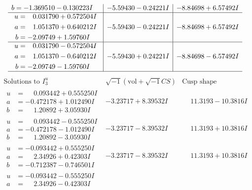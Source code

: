 \documentclass[1p]{elsarticle_modified}
\theoremstyle{definition}
\newcommand{\I}{\sqrt{-1}}
\begin{document}
$$\begin{array}{c|c|c}
\begin{aligned}
b &= -1.369510 - 0.130223 I\end{aligned}
 & -5.59430 - 0.24221 I & -8.84698 + 6.57492 I \\ \hline\begin{aligned}
u &= \phantom{-}0.031790 + 0.572504 I \\
a &= \phantom{-}1.051370 + 0.640212 I \\
b &= -2.09749 + 1.59760 I\end{aligned}
 & -5.59430 - 0.24221 I & -8.84698 + 6.57492 I \\ \hline\begin{aligned}
u &= \phantom{-}0.031790 - 0.572504 I \\
a &= \phantom{-}1.051370 - 0.640212 I \\
b &= -2.09749 - 1.59760 I\end{aligned}
 & -5.59430 + 0.24221 I & -8.84698 - 6.57492 I\\
 \hline 
 \end{array}$$\newpage$$\begin{array}{c|c|c}  
\text{Solutions to }I^u_{3}& \I (\text{vol} + \sqrt{-1}CS) & \text{Cusp shape}\\
 \hline 
\begin{aligned}
u &= \phantom{-}0.093442 + 0.555250 I \\
a &= -0.472178 + 1.012490 I \\
b &= \phantom{-}1.20892 + 3.05930 I\end{aligned}
 & -3.23717 + 8.39532 I & \phantom{-}11.3193 - 10.3816 I \\ \hline\begin{aligned}
u &= \phantom{-}0.093442 - 0.555250 I \\
a &= -0.472178 - 1.012490 I \\
b &= \phantom{-}1.20892 - 3.05930 I\end{aligned}
 & -3.23717 - 8.39532 I & \phantom{-}11.3193 + 10.3816 I \\ \hline\begin{aligned}
u &= -0.093442 + 0.555250 I \\
a &= \phantom{-}2.34926 + 0.42303 I \\
b &= -0.712387 - 0.746501 I\end{aligned}
 & -3.23717 - 8.39532 I & \phantom{-}11.3193 + 10.3816 I \\ \hline\begin{aligned}
u &= -0.093442 - 0.555250 I \\
a &= \phantom{-}2.34926 - 0.42303 I \\

\end{aligned}
\end{array}$$
\end{document}
